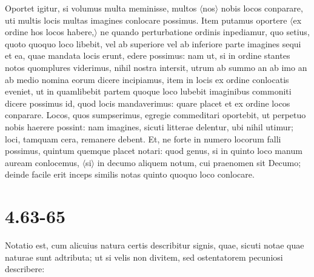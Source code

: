 Oportet igitur, si volumus multa meminisse, multos $\langle$nos$\rangle$ nobis locos conparare, uti multis locis multas imagines conlocare possimus. Item putamus oportere $\langle$ex ordine hos locos habere,$\rangle$ ne quando perturbatione ordinis inpediamur, quo setius, quoto quoquo loco libebit, vel ab superiore vel ab inferiore parte imagines sequi et ea, quae mandata locis erunt, edere possimus: nam ut, si in ordine stantes notos quomplures viderimus, nihil nostra intersit, utrum ab summo an ab imo an ab medio nomina eorum dicere incipiamus, item in locis ex ordine conlocatis eveniet, ut in quamlibebit partem quoque loco lubebit imaginibus commoniti dicere possimus id, quod locis mandaverimus: quare placet et ex ordine locos conparare. Locos, quos sumpserimus, egregie commeditari oportebit, ut perpetuo nobis haerere possint: nam imagines, sicuti litterae delentur, ubi nihil utimur; loci, tamquam cera, remanere debent. Et, ne forte in numero locorum falli possimus, quintum quemque placet notari: quod genus, si in quinto loco manum auream conlocemus, $\langle$si$\rangle$ in decumo aliquem notum, cui praenomen sit Decumo; deinde facile erit inceps similis notas quinto quoquo loco conlocare.

\section*{4.63-65}

Notatio est, cum alicuius natura certis describitur signis, quae, sicuti notae quae naturae sunt adtributa; ut si velis non divitem, sed ostentatorem pecuniosi describere:

